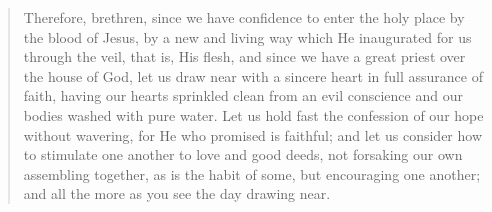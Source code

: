 \documentclass[letterpaper, 12pt]{article}
\begin{document}
    \begin{quote}

        Therefore, brethren, since we have confidence to enter the holy
        place by the blood of Jesus, by a new and living way which He
        inaugurated for us through the veil, that is, His flesh, and
        since we have a great priest over the house of God, let us draw
        near with a sincere heart in full assurance of faith, having our
        hearts sprinkled clean from an evil conscience and our bodies
        washed with pure water. Let us hold fast the confession of our
        hope without wavering, for He who promised is faithful; and let
        us consider how to stimulate one another to love and good deeds,
        not forsaking our own assembling together, as is the habit of
        some, but encouraging one another; and all the more as you see
        the day drawing near.

    \end{quote}
\end{document}
